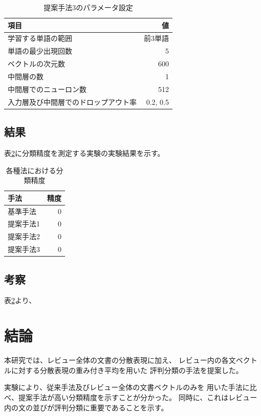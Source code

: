\documentclass{ttithesis}
\begin{document}
\begin{table}
  \caption{提案手法3のパラメータ設定}
  \begin{tabular}{l | r}\label{tab:ParametersOfMyMethod3}
    項目 & 値 \\
    \hline
    学習する単語の範囲 & 前3単語 \\
    単語の最少出現回数 & 5 \\
    ベクトルの次元数 & 600 \\
    中間層の数 & 1 \\
    中間層でのニューロン数 & 512 \\
    入力層及び中間層でのドロップアウト率 & 0.2, 0.5 \\
  \end{tabular}
\end{table}


\subsection{結果}

表\ref{tab:Accuracies}に分類精度を測定する実験の実験結果を示す。

\begin{table}
  \caption{各種法における分類精度}
  \begin{tabular}{l | r}\label{tab:Accuracies}
    手法 & 精度 \\
    \hline
    基準手法 & 0 \\
    提案手法1 & 0 \\
    提案手法2 & 0 \\
    提案手法3 & 0 \\
  \end{tabular}
\end{table}

\subsection{考察}

表\ref{tab:Accuracies}より、



\section{結論}

本研究では、レビュー全体の文書の分散表現に加え、
レビュー内の各文ベクトルに対する分散表現の重み付き平均を用いた
評判分類の手法を提案した。

実験により、従来手法\cite{fujitani15}及びレビュー全体の文書ベクトルのみを
用いた手法に比べ、提案手法が高い分類精度を示すことが分かった。
同時に、これはレビュー内の文の並びが評判分類に重要であることを示す。
\end{document}
